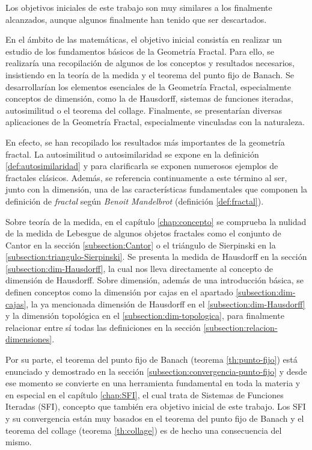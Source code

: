 Los objetivos iniciales de este trabajo son muy similares a los finalmente alcanzados, aunque algunos finalmente han tenido que ser descartados. 

En el ámbito de las matemáticas, el objetivo inicial consistía en realizar un estudio de los fundamentos básicos de la Geometría Fractal. Para ello, se realizaría una recopilación de algunos de los conceptos y resultados necesarios, insistiendo en la teoría de la medida y el teorema del punto fijo de Banach. Se desarrollarían los elementos esenciales de la Geometría Fractal, especialmente conceptos de dimensión, como la de Hausdorff, sistemas de funciones iteradas, autosimilitud o el teorema del collage. Finalmente, se presentarían diversas aplicaciones de la Geometría Fractal, especialmente vinculadas con la naturaleza.

En efecto, se han recopilado los resultados más importantes de la geometría fractal. La autosimilitud o autosimilaridad se expone en la definición \ref{def:autosimilaridad} y para clarificarla se exponen numerosos ejemplos de fractales clásicos. Además, se referencia continuamente a este término al ser, junto con la dimensión, una de las características fundamentales que componen la definición de \textit{fractal} según \textit{Benoit Mandelbrot} (definición \ref{def:fractal}).

Sobre teoría de la medida, en el capítulo \ref{chap:concepto} se comprueba la nulidad de la medida de Lebesgue de algunos objetos fractales como el conjunto de Cantor en la sección \ref{subsection:Cantor} o el triángulo de Sierpinski en la \ref{subsection:triangulo-Sierpinski}. Se presenta la medida de Hausdorff en la sección \ref{subsection:dim-Hausdorff}, la cual nos lleva directamente al concepto de dimensión de Hausdorff. Sobre dimensión, además de una introducción básica, se definen conceptos como la dimensión por cajas en el apartado \ref{subsection:dim-cajas}, la ya mencionada dimensión de Hausdorff en el \ref{subsection:dim-Hausdorff} y la dimensión topológica en el \ref{subsection:dim-topologica}, para finalmente relacionar entre sí todas las definiciones en la sección \ref{subsection:relacion-dimensiones}. 

Por su parte, el teorema del punto fijo de Banach (teorema \ref{th:punto-fijo}) está enunciado y demostrado en la sección \ref{subsection:convergencia-punto-fijo} y desde ese momento se convierte en una herramienta fundamental en toda la materia y en especial en el capítulo \ref{chap:SFI}, el cual trata de Sistemas de Funciones Iteradas (SFI), concepto que también era objetivo inicial de este trabajo. Los SFI y su convergencia están muy basados en el teorema del punto fijo de Banach y el teorema del collage (teorema \ref{th:collage}) es de hecho una consecuencia del mismo.

